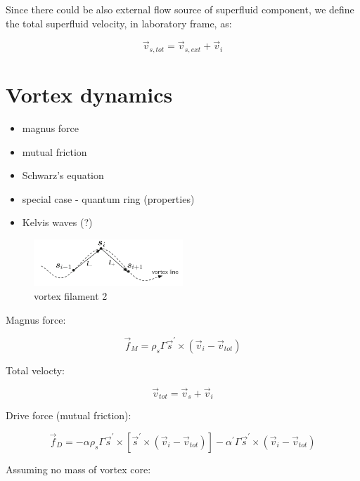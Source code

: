 Since there could be also external flow source of superfluid component, we define the total superfluid velocity, in laboratory frame, as:

\begin{equation}
\vec{v}_{s,tot} = \vec{v}_{s,ext} + \vec{v}_i
\end{equation}

\section{Vortex dynamics}
\begin{itemize}
	\item magnus force
	\item mutual friction
	\item Schwarz's equation
	\item special case - quantum ring (properties)
	\item Kelvis waves (?)
\end{itemize}

\begin{figure}[h]
	\centering
	\includegraphics[width=0.5\textwidth]{graphics/theory/filament2}
	\caption{vortex filament 2}
	\label{filament2}
\end{figure}

Magnus force:

\begin{equation}
\vec{f}_M = \rho_s \Gamma \vec{s}^{\prime} \times (\vec{v}_i - \vec{v}_{tot})
\end{equation}

Total velocty:

\begin{equation}
\vec{v}_{tot} = \vec{v}_s + \vec{v}_i
\end{equation}


Drive force (mutual friction):

\begin{equation}
\vec{f}_D = - \alpha\rho_s\Gamma\vec{s}^{\prime} \times [\vec{s}^{\prime} \times (\vec{v}_i - \vec{v}_{tot})] - \alpha^{\prime}\Gamma\vec{s}^{\prime} \times (\vec{v}_i - \vec{v}_{tot})
\end{equation}

Assuming no mass of vortex core:

